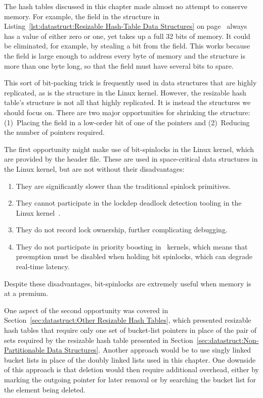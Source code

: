 The hash tables discussed in this chapter made almost no attempt to conserve
memory.
For example, the  field in the  structure in
Listing~\ref{lst:datastruct:Resizable Hash-Table Data Structures} on
page~\pageref{lst:datastruct:Resizable Hash-Table Data Structures}
always has a value of either zero or one, yet takes up a full 32 bits
of memory.
It could be eliminated, for example, by stealing a bit from the
 field.
This works because the  field is large enough to
address every byte of memory and the  structure
is more than one byte long, so that
the  field must have several bits to spare.

This sort of bit-packing trick is frequently used in data structures
that are highly replicated, as is the  structure in the Linux
kernel.
However, the resizable hash table's  structure is not all that
highly replicated.
It is instead the  structures we should focus on.
There are two major opportunities for shrinking the  structure:
(1)~Placing the  field in a low-order bit of one of the
 pointers and (2)~Reducing the number of pointers required.

The first opportunity might make use of bit-spinlocks in the Linux
kernel, which are provided by the 
header file.
These are used in space-critical data structures in the Linux kernel,
but are not without their disadvantages:

\begin{enumerate}
\item	They are significantly slower than the traditional spinlock
	primitives.
\item	They cannot participate in the lockdep deadlock detection
	tooling in the Linux kernel~\cite{JonathanCorbet2006lockdep}.
\item	They do not record lock ownership, further complicating
	debugging.
\item	They do not participate in priority boosting in \rt\ kernels,
	which means that preemption must be disabled when holding
	bit spinlocks, which can degrade real-time latency.
\end{enumerate}

Despite these disadvantages, bit-spinlocks are extremely useful when
memory is at a premium.

One aspect of the second opportunity was covered in
Section~\ref{sec:datastruct:Other Resizable Hash Tables},
which presented resizable hash tables that require only one
set of bucket-list pointers in place of the pair of sets required
by the resizable hash table presented in
Section~\ref{sec:datastruct:Non-Partitionable Data Structures}.
Another approach would be to use singly linked bucket lists in
place of the doubly linked lists used in this chapter.
One downside of this approach is that deletion would then require
additional overhead, either by marking the outgoing pointer
for later removal
or by searching the bucket list for the element being deleted.

